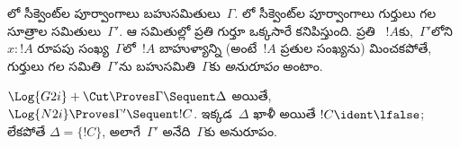 \documentclass[../../../include/open-logic-section]{subfiles}
\begin{document}


లో సీక్వెంట్‌ల పూర్వాంగాలు  బహుసమితులు~$\Gamma$. లో సీక్వెంట్‌ల పూర్వాంగాలు గుర్తులు గల సూత్రాల సమితులు~$\Gamma'$. ఆ సమితుల్లో ప్రతి గుర్తూ ఒక్కసారే కనిపిస్తుంది. ప్రతి ~$!A$కు,~$\Gamma'$లోని $x : !A$ రూపపు  సంఖ్య~$\Gamma$లో~$!A$ బాహుళ్యాన్ని (అంటే~$!A$ ప్రతుల సంఖ్యను) మించకపోతే, గుర్తులు గల  సమితి~$\Gamma'$ను బహుసమితి~$\Gamma$కు \emph{అనురూపం} అంటాం.

\begin{prop}
$\Log{G2i} + \Cut \Proves \Gamma \Sequent \Delta$ అయితే, $\Log{N2i}
\Proves \Gamma' \Sequent !C$. ఇక్కడ~$\Delta$ ఖాళీ అయితే $!C \ident \lfalse$; లేకపోతే $\Delta = \{!C\}$, అలాగే~$\Gamma'$ అనేది~$\Gamma$కు అనురూపం.
\end{prop}
\end{document}
